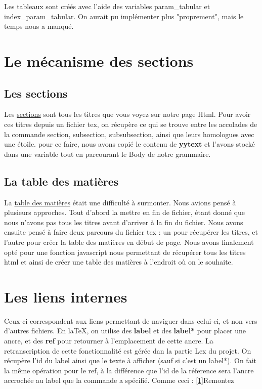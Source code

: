 \documentclass[10pt,a4paper]{report}
\begin{document}
Les tableaux sont créés avec l'aide des variables param_tabular et index_param_tabular. On aurait pu implémenter plus "proprement", mais le temps nous a manqué.

\section{Le mécanisme des sections}

\subsection{Les sections}

Les \underline{sections} sont tous les titres que vous voyez sur notre page Html. Pour avoir ces titres depuis un fichier tex, on récupère ce qui se trouve entre les accolades de la commande section, subsection, subsubsection, ainsi que leurs homologues avec une étoile. pour ce faire, nous avons copié le contenu de {\bf yytext} et l'avons stocké dans une variable tout en parcourant le Body de notre grammaire.

\subsection{La table des matières}

La \underline{table des matières} était une difficulté à surmonter. Nous avions pensé à plusieurs approches. Tout d'abord la mettre en fin de fichier, étant donné que nous n'avons pas tous les titres avant d'arriver à la fin du fichier. Nous avons ensuite pensé à faire deux parcours du fichier tex : un pour récupérer les titres, et l'autre pour créer la table des matières en début de page. Nous avons finalement opté pour une fonction javascript nous permettant de récupérer tous les titres html et ainsi de créer une table des matières à l'endroit où on le souhaite.

\section{Les liens internes}

Ceux-ci correspondent aux liens permettant de naviguer dans celui-ci, et non vers d'autres fichiers. En laTeX, on utilise des {\bf label} et des {\bf label*} pour placer une ancre, et des {\bf ref} pour retourner à l'emplacement de cette ancre. La retranscription de cette fonctionnalité est gérée dan la partie Lex du projet. On récupère l'id du label ainsi que le texte à afficher (sauf si c'est un label*). On fait la même opération pour le ref, à la différence que l'id de la réference sera l'ancre accrochée au label que la commande a spécifié. Comme ceci :
\ref{1}{Remontez}
\end{document}
